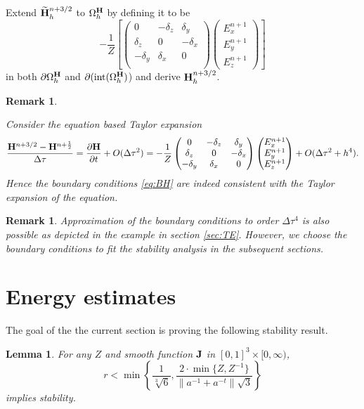 \documentclass[12pt,reqno]{amsart}
\newcommand{\h}{{\bf H}}
\newcommand{\J}{{\bf J}}
\newtheorem{lemma}[theorem]{Lemma}
\newtheorem{rem}[theorem]{Remark}
\theoremstyle{definition}
\numberwithin{equation}{section}
\newcommand{\intr}[1]{\mathrm{int}(#1)}
\def\Gwh{\Omega_h}
\begin{document}
		Extend $\widetilde{\h}_h^{n+3/2}$ 
	to $\Gwh^\h$ by defining it to be 
	$$
		-\frac{1}{Z}
	\left[ 
	\begin{pmatrix}
		0& -\delta_z & \delta _y\\
		\delta_z&0&-\delta_x\\
		-\delta_y&\delta_x&0\\
	\end{pmatrix}
	\begin{pmatrix}
		E_x^{n+1}\\
		E_y^{n+1}\\
		E_z^{n+1}
	\end{pmatrix}\right]
	$$
	in both $\partial \Gwh^\h$ and $\partial (\intr{\Gwh^{\h}}$)
	and derive $\h_h^{n+3/2}$. 

\begin{rem}\label{rem:expB}


Consider the equation based  Taylor expansion
	$$
	\frac{\h^{n+3/2}-\h^{n+\frac{1}{2} } }{\Delta \tau}=
	\frac{\partial \h}{\partial t}+O(\Delta \tau ^2)=
	-\frac{1}{Z}	\begin{pmatrix}
		0& -\delta_z & \delta _y\\
		\delta_z&0&-\delta_x\\
		-\delta_y&\delta_x&0\\
	\end{pmatrix}
	\begin{pmatrix}
		E_x^{n+1}\\
		E_y^{n+1}\\
		E_z^{n+1}
	\end{pmatrix}+O(\Delta \tau^2+h^4).
	$$
	Hence the  boundary conditions \eqref{eq:BH} are 
 indeed consistent with the Taylor expansion of the equation.
\end{rem}
   
	\begin{rem}
	Approximation of the boundary conditions to order $\Delta \tau ^4$ is also possible as depicted in the example in section \ref{sec:TE}. However, we choose the boundary conditions to fit the stability analysis in the subsequent sections.
	\end{rem}

	


	

	\section{Energy estimates}
	The goal of the the current section is proving the following stability result.
	\begin{lemma}\label{lem:coer}
		For any $Z$ and smooth function $\J$ in $[0,1]^3\times [0,\infty)$, 
		$$
		r<\min \left \{  \frac{1}{\sqrt[3]{6}},\frac{2\cdot\min\{Z,Z^{-1}\}}
		{\|a^{-1}+a^{-t}\|\sqrt{3}}  \right \}
	$$
	implies stability.
 		\end{lemma}
 
\end{document}

